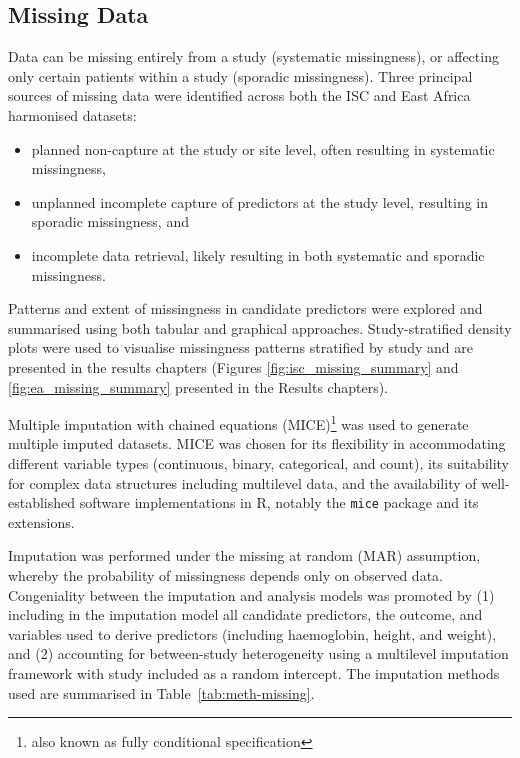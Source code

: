 \subsection{\label{sec:meth-missing}Missing Data}

Data can be missing entirely from a study (systematic missingness), or affecting only certain patients within a study (sporadic missingness). Three principal sources of missing data were identified across both the ISC and East Africa harmonised datasets:

\begin{itemize}[noitemsep]
  \item planned non-capture at the study or site level, often resulting in systematic missingness,
  \item unplanned incomplete capture of predictors at the study level, resulting in sporadic missingness, and
  \item incomplete data retrieval, likely resulting in both systematic and sporadic missingness.
\end{itemize}

Patterns and extent of missingness in candidate predictors were explored and summarised using both tabular and graphical approaches. Study-stratified density plots were used to visualise missingness patterns stratified by study and are presented in the results chapters (Figures \ref{fig:isc_missing_summary} and \ref{fig:ea_missing_summary} presented in the Results chapters).

Multiple imputation with chained equations (MICE)\footnote{also known as fully conditional specification} was used to generate multiple imputed datasets\cite{white2011,van_buuren2021}. MICE was chosen for its flexibility in accommodating different variable types (continuous, binary, categorical, and count), its suitability for complex data structures including multilevel data, and the availability of well-established software implementations in R, notably the \texttt{mice} package and its extensions\cite{van-buuren2011,audigier2023}.

Imputation was performed under the missing at random (MAR) assumption, whereby the probability of missingness depends only on observed data\cite{rubin1987}. Congeniality between the imputation and analysis models was promoted by (1) including in the imputation model all candidate predictors, the outcome, and variables used to derive predictors (including haemoglobin, height, and weight), and (2) accounting for between-study heterogeneity using a multilevel imputation framework with study included as a random intercept\cite{white2011}. The imputation methods used are summarised in Table~\ref{tab:meth-missing}.

